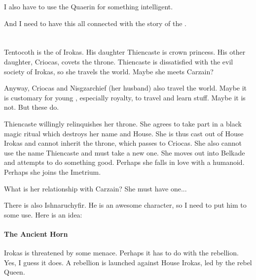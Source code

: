 
I also have to use the Quaerin for something intelligent. 

And I need to have this all connected with the story of the \dragonkings{}. 



\newpage
\section{\Dragonkings{}}
Tentocoth is the \dragonking{} of Irokas. His daughter Thiencaste is crown princess. His other daughter, Criocas, covets the throne. Thiencaste is dissatisfied with the evil society of Irokas, so she travels the world. Maybe she meets Carzain? 

Anyway, Criocas and Nisgzarchief (her husband) also travel the world. Maybe it is customary for young \dragons{}, especially royalty, to travel and learn stuff. Maybe it is not. But these do. 

Thiencaste willingly relinquishes her throne. She agrees to take part in a black magic ritual which destroys her name and House. She is thus cast out of House Irokas and cannot inherit the throne, which passes to Criocas. She also cannot use the name Thiencaste and must take a new one. She moves out into Belkade and attempts to do something good. Perhaps she falls in love with a humanoid. Perhaps she joins the Imetrium. 

What is her relationship with Carzain? She must have one... 

There is also Ishnaruchyfir. He is an awesome character, so I need to put him to some use. Here is an idea: 

\paragraph{The Ancient \Dragon{} Horn}
Irokas is threatened by some menace. Perhaps it has to do with the rebellion. Yes, I guess it does. A rebellion is launched against House Irokas, led by the rebel Queen. 



%
%
